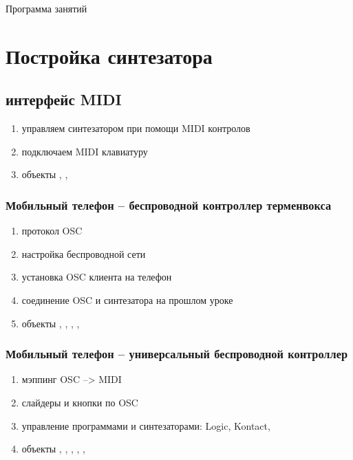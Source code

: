 \documentclass[12pt]{article}
\begin{document}
	
\vspace*{0.5cm}

\noindent
{\huge Программа занятий}



\section{Постройка синтезатора}



\subsection{интерфейс MIDI}
\begin{enumerate}
	\item управляем синтезатором при помощи MIDI контролов
	\item подключаем MIDI клавиатуру
	\item объекты , , 
\end{enumerate}

\subsubsection{Мобильный телефон -- беспроводной контроллер терменвокса}

\begin{enumerate}
\item протокол OSC
\item настройка беспроводной сети
\item установка OSC клиента на телефон
\item соединение OSC и синтезатора на прошлом уроке
\item объекты , , , , \pdobj{==}  
\end{enumerate}

\subsubsection{Мобильный телефон -- универсальный беспроводной контроллер}

\begin{enumerate}
\item мэппинг OSC --> MIDI
\item слайдеры и кнопки по OSC
\item управление программами и синтезаторами: Logic, Kontact,
\item объекты , , , , ,  		
\end{enumerate}
\end{document}
